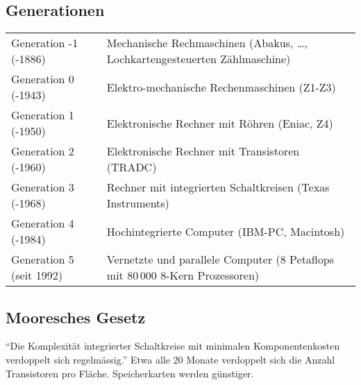 \subsection{Generationen}
\settowidth{\MyLenA}{Generation 5 (seit 1992)~~}
\begin{tabular}{@{}p{\the\MyLenA}%
				@{}p{\linewidth-\the\MyLenA}}
Generation -1 (-1886) & Mechanische Rechmaschinen (Abakus, \dots, Lochkartengesteuerten Zählmaschine)\\
Generation 0 (-1943) & Elektro-mechanische Rechenmaschinen (Z1-Z3)\\
Generation 1 (-1950) & Elektronische Rechner mit Röhren (Eniac, Z4)\\
Generation 2 (-1960) & Elektronische Rechner mit Transistoren (TRADC)\\
Generation 3 (-1968) & Rechner mit integrierten Schaltkreisen (Texas Instruments)\\
Generation 4 (-1984) & Hochintegrierte Computer (IBM-PC, Macintosh)\\
Generation 5 (seit 1992) & Vernetzte und parallele Computer (8 Petaflops mit 80\,000 8-Kern Prozessoren)\\
\end{tabular}

\subsection{Mooresches Gesetz}
\enquote{Die Komplexität integrierter Schaltkreise mit minimalen Komponentenkosten verdoppelt sich regelmässig.}
Etwa alle 20 Monate verdoppelt sich die Anzahl Transistoren pro Fläche. Speicherkarten werden günstiger.


